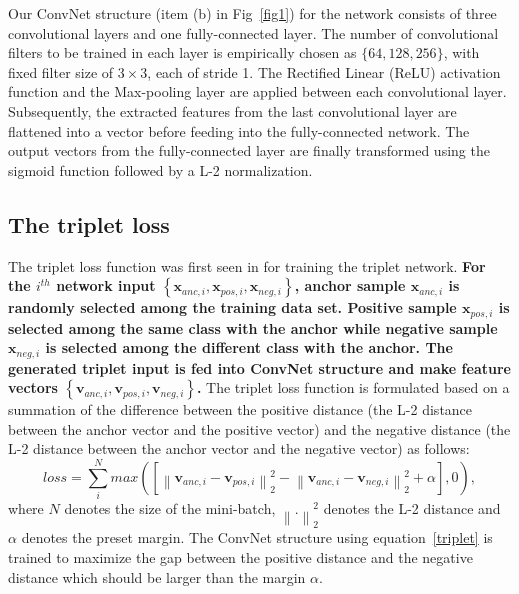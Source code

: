 \documentclass[sigconf]{acmart}
\begin{document}
Our ConvNet structure (item (b) in Fig~\ref{fig1}) for the network consists of three convolutional layers and one fully-connected layer. The number of convolutional filters to be trained in each layer is empirically chosen as $\{64, 128, 256\}$, with fixed filter size of $3\times3$, each of stride 1. The Rectiﬁed Linear (ReLU) activation function and the Max-pooling layer are applied between each convolutional layer. Subsequently, the extracted features from the last convolutional layer are flattened into a vector before feeding into the fully-connected network.
The output vectors from the fully-connected layer are finally transformed using the sigmoid function followed by a L-2 normalization.

\subsection{The triplet loss}

The triplet loss function was first seen in \cite{hoffer2015deep} for training the triplet network.
\textbf{For the $i^{th}$ network input $\left\{\mathbf{x}_{anc,i}, \mathbf{x}_{pos,i}, \mathbf{x}_{neg,i}\right\}$, anchor sample $\mathbf{x}_{anc,i}$ is randomly selected among the training data set. Positive sample $\mathbf{x}_{pos,i}$ is selected among the same class with the anchor while negative sample $\mathbf{x}_{neg,i}$ is selected among the different class with the anchor. The generated triplet input is fed into ConvNet structure and make feature vectors $\left\{\mathbf{v}_{anc,i},\mathbf{v}_{pos,i},\mathbf{v}_{neg,i}\right\}$.}
The triplet loss function is formulated based on a summation of the difference between the positive distance (the L-2 distance between the anchor vector and the positive vector) and the negative distance (the L-2 distance between the anchor vector and the negative vector) as follows:
\begin{equation}
    loss = \sum_i^N max\left({ \left[ {\left\| {{\mathbf{v}_{anc,i}} - {\mathbf{v}_{pos,i}}} \right\|_2^2} - {\left\| {{\mathbf{v}_{anc,i}} - {\mathbf{v}_{neg,i}}} \right\|_2^2}  + \alpha \right]},0 \right),\label{triplet}
\end{equation}
where $N$ denotes the size of the mini-batch, ${\left\| . \right\|_2^2}$ denotes the L-2 distance and $\alpha$ denotes the preset margin.
The ConvNet structure using equation~\eqref{triplet} is trained to maximize the gap between the positive distance and the negative distance which should be larger than the margin $\alpha$.
\end{document}
